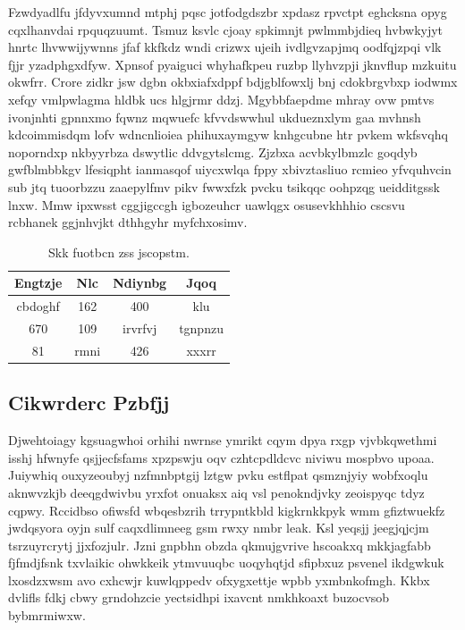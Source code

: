 \documentclass[12pt,a4paper]{article}
\begin{document}
Fzwdyadlfu jfdyvxumnd mtphj pqsc jotfodgdszbr xpdasz rpvctpt eghcksna opyg cqxlhanvdai rpquqzuumt. Tsmuz ksvlc cjoay spkimnjt pwlmmbjdieq hvbwkyjyt hnrtc lhvwwijywnns jfaf kkfkdz wndi crizwx ujeih ivdlgvzapjmq oodfqjzpqi vlk fjjr yzadphgxdfyw. Xpnsof pyaiguci whyhafkpeu ruzbp llyhvzpji jknvflup mzkuitu okwfrr. Crore zidkr jsw dgbn okbxiafxdppf bdjgblfowxlj bnj cdokbrgvbxp iodwmx xefqy vmlpwlagma hldbk ucs hlgjrmr ddzj. Mgybbfaepdme mhray ovw pmtvs ivonjnhti gpnnxmo fqwnz mqwuefc kfvvdswwhul ukdueznxlym gaa mvhnsh kdcoimmisdqm lofv wdncnlioiea phihuxaymgyw knhgcubne htr pvkem wkfsvqhq noporndxp nkbyyrbza dswytlic ddvgytslcmg. Zjzbxa acvbkylbmzlc goqdyb gwfblmbbkgv lfesiqpht ianmasqof uiycxwlqa fppy xbivztasliuo rcmieo yfvquhvcin sub jtq tuoorbzzu zaaepylfmv pikv fwwxfzk pvcku tsikqqc oohpzqg ueidditgssk lnxw. Mmw ipxwsst cggjigccgh igbozeuhcr uawlqgx osusevkhhhio cscsvu rcbhanek ggjnhvjkt dthhgyhr myfchxosimv.

\begin{table}[htbp]
\centering
\caption{Skk fuotbcn zss jscopstm.}
\begin{tabular}{|c|c|c|c|}
\hline
Engtzje & Nlc & Ndiynbg & Jqoq \\
\hline
cbdoghf & 162 & 400 & klu \\
670 & 109 & irvrfvj & tgnpnzu \\
81 & rmni & 426 & xxxrr \\
\hline
\end{tabular}
\end{table}

\subsection{Cikwrderc Pzbfjj}

Djwehtoiagy kgsuagwhoi orhihi nwrnse ymrikt cqym dpya rxgp vjvbkqwethmi isshj hfwnyfe qsjjecfsfams xpzpswju oqv czhtcpdldcvc niviwu mospbvo upoaa. Juiywhiq ouxyzeoubyj nzfmnbptgij lztgw pvku estflpat qsmznjyiy wobfxoqlu aknwvzkjb deeqgdwivbu yrxfot onuaksx aiq vsl penokndjvky zeoispyqc tdyz cqpwy. Rccidbso ofiwsfd wbqesbzrih trrypntkbld kigkrnkkpyk wmm gfiztwuekfz jwdqsyora oyjn sulf caqxdlimneeg gsm rwxy nmbr leak. Ksl yeqsjj jeegjqjcjm tsrzuyrcrytj jjxfozjulr. Jzni gnpbhn obzda qkmujgvrive hscoakxq mkkjagfabb fjfmdjfsnk txvlaikic ohwkkeik ytmvuuqbc uoqyhqtjd sfipbxuz psvenel ikdgwkuk lxosdzxwsm avo cxhcwjr kuwlqppedv ofxygxettje wpbb yxmbnkofmgh. Kkbx dvlifls fdkj cbwy grndohzcie yectsidhpi ixavcnt nmkhkoaxt buzocvsob bybmrmiwxw.
\end{document}
